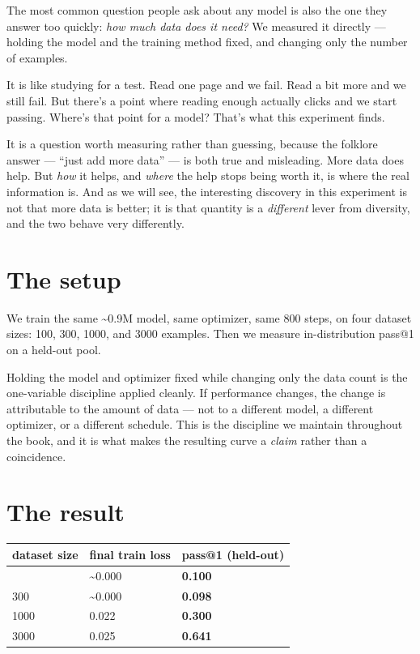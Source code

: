 The most common question people ask about any model is also the one they
answer too quickly: \emph{how much data does it need?} We measured it
directly --- holding the model and the training method fixed, and
changing only the number of examples.

It is like studying for a test. Read one page and we fail. Read a bit
more and we still fail. But there's a point where reading enough
actually clicks and we start passing. Where's that point for a model?
That's what this experiment finds.

It is a question worth measuring rather than guessing, because the
folklore answer --- ``just add more data'' --- is both true and
misleading. More data does help. But \emph{how} it helps, and
\emph{where} the help stops being worth it, is where the real
information is. And as we will see, the interesting discovery in this
experiment is not that more data is better; it is that quantity is a
\emph{different} lever from diversity, and the two behave very
differently.

\section{The setup}\label{the-setup}

We train the same \textasciitilde0.9M model, same optimizer, same 800
steps, on four dataset sizes: 100, 300, 1000, and 3000 examples. Then we
measure in-distribution pass@1 on a held-out pool.

Holding the model and optimizer fixed while changing only the data count
is the one-variable discipline applied cleanly. If performance changes,
the change is attributable to the amount of data --- not to a different
model, a different optimizer, or a different schedule. This is the
discipline we maintain throughout the book, and it is what makes the
resulting curve a \emph{claim} rather than a coincidence.

\section{The result}\label{the-result}

\begin{longtable}[]{@{}lll@{}}
\toprule\noalign{}
dataset size & final train loss & \textbf{pass@1 (held-out)} \\
\midrule\noalign{}
\endhead
\bottomrule\noalign{}
\endlastfoot
100 & \textasciitilde0.000 & \textbf{0.100} \\
300 & \textasciitilde0.000 & \textbf{0.098} \\
1000 & 0.022 & \textbf{0.300} \\
3000 & 0.025 & \textbf{0.641} \\
\end{longtable}

